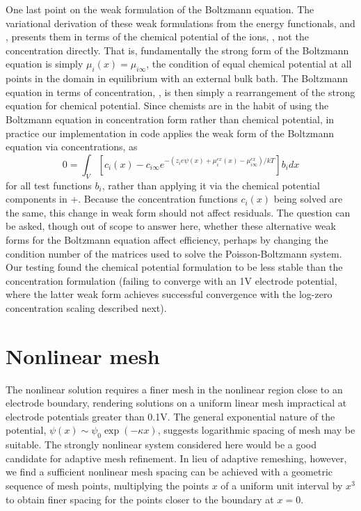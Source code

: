 One last point on the weak formulation of the Boltzmann equation. The variational
derivation of these weak formulations from the energy functionals,
 and , presents them in terms of the
chemical potential of the ions, , not the concentration directly. That
is, fundamentally the strong form of the Boltzmann equation is simply $\mu_i(x) =
\mu_{i\infty}$, the condition of equal chemical potential at all
points in the domain in equilibrium with an external bulk bath.
The Boltzmann
equation in terms of 
concentration, , is then simply a rearrangement of
the strong equation for chemical potential. Since chemists are in the
habit of using the Boltzmann equation in concentration form rather
than chemical potential, in practice our implementation in code applies the weak
form of the Boltzmann equation via concentrations, as
\begin{equation}
0 =   \int_V \left[ c_i(x) - c_{i\infty}
    e^{-\left(z_i e \psi(x) +
      \mu_i^{ex}(x)-\mu_{i\infty}^{ex}\right)/kT} \right] b_i
dx 
\label{weak_Boltzmann_conc}
\end{equation}
for all test functions $b_i$, rather than applying it via the chemical
potential components in 
+. Because the concentration functions $c_i(x)$ being
solved are the same, this change in weak form should not affect
residuals. The question can be asked, though out of scope
to answer here, whether these alternative weak forms for the Boltzmann
equation affect efficiency, perhaps by changing the condition number
of the matrices used to solve the Poisson-Boltzmann system. Our
testing found the chemical potential formulation to be less stable than the
concentration formulation (failing to converge with an 1V electrode
potential, where the latter weak form achieves successful convergence
with the log-zero concentration scaling described next).

\section{Nonlinear mesh}
The nonlinear solution requires a finer mesh in the nonlinear region
close to an electrode boundary, rendering solutions on a uniform linear mesh  impractical at electrode
potentials greater than 0.1V.  The general exponential nature of the potential,
$\psi(x) \sim \psi_{0} \exp(-\kappa x)$, suggests logarithmic spacing of
mesh may be suitable. The strongly nonlinear  system
considered here  would be a good candidate for adaptive mesh refinement. In
lieu of adaptive remeshing, however, we find a sufficient nonlinear
mesh spacing can be achieved with a geometric sequence of mesh points,
multiplying the points $x$ of a uniform unit interval by $x^3$ to
obtain finer spacing for the points closer to the boundary at $x=0$.

